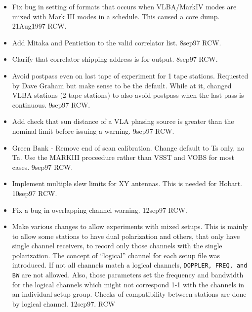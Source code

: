 \documentclass{report}
\begin{document}
\begin{itemize}

\item Fix bug in setting of formats that occurs when VLBA/MarkIV
      modes are mixed with Mark III modes in a schedule.  This caused
      a core dump.  21Aug1997 RCW.

\item Add Mitaka and Pentiction to the valid correlator list.
      8sep97 RCW.

\item Clarify that correlator shipping address is for output.
      8sep97 RCW.

\item Avoid postpass even on last tape of experiment for 1 tape
      stations.  Requested by Dave Graham but make sense to be
      the default.  While at it, changed VLBA stations (2 tape
      stations) to also avoid postpass when the last pass is
      continuous.  9sep97 RCW.

\item Add check that sun distance of a VLA phasing source is greater
      than the nominal limit before issuing a warning.  9sep97 RCW.

\item Green Bank - Remove end of scan calibration.  Change default
      to Ts only, no Ta.  Use the MARKIII proceedure rather than VSST
      and VOBS for most cases.  9sep97 RCW.

\item Implement multiple slew limits for XY antennas.  This is needed
      for Hobart.  10sep97  RCW.

\item Fix a bug in overlapping channel warning.  12sep97 RCW.

\item Make various changes to allow experiments with mixed setups.
      This is mainly to allow some stations to have dual polarization
      and others, that only have single channel receivers, to record
      only those channels with the single polarization.  The concept
      of ``logical'' channel for each setup file was introduced.
      If not all channels match a logical channels, {\tt DOPPLER,
      FREQ, and BW} are not allowed.  Also, those parameters set
      the frequency and bandwidth for the logical channels which
      might not correspond 1-1 with the channels in an individual
      setup group.  Checks of compatibility between stations are
      done by logical channel.  12sep97.  RCW


\end{itemize}
\end{document}
